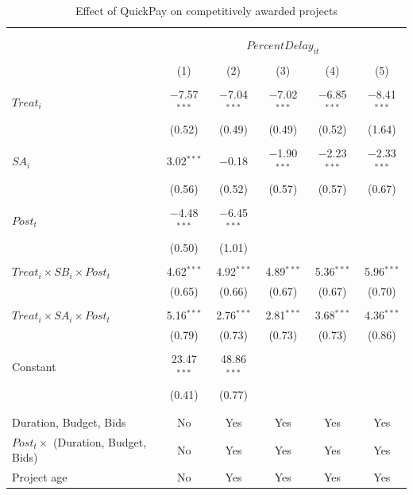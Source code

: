 \documentclass[
]{article}
\begin{document}
\begin{table}[H] \centering 
  \caption{Effect of QuickPay on competitively awarded projects} 
  \label{} 
\small 
\begin{tabular}{@{\extracolsep{-2pt}}lccccc} 
\\[-1.8ex]\hline 
\hline \\[-1.8ex] 
\\[-1.8ex] & \multicolumn{5}{c}{$PercentDelay_{it}$  } \\ 
\\[-1.8ex] & (1) & (2) & (3) & (4) & (5)\\ 
\hline \\[-1.8ex] 
 $Treat_i$ & $-$7.57$^{***}$ & $-$7.04$^{***}$ & $-$7.02$^{***}$ & $-$6.85$^{***}$ & $-$8.41$^{***}$ \\ 
  & (0.52) & (0.49) & (0.49) & (0.52) & (1.64) \\ 
  & & & & & \\ 
 $SA_i$ & 3.02$^{***}$ & $-$0.18 & $-$1.90$^{***}$ & $-$2.23$^{***}$ & $-$2.33$^{***}$ \\ 
  & (0.56) & (0.52) & (0.57) & (0.57) & (0.67) \\ 
  & & & & & \\ 
 $Post_t$ & $-$4.48$^{***}$ & $-$6.45$^{***}$ &  &  &  \\ 
  & (0.50) & (1.01) &  &  &  \\ 
  & & & & & \\ 
 $Treat_i \times SB_i \times Post_t$ & 4.62$^{***}$ & 4.92$^{***}$ & 4.89$^{***}$ & 5.36$^{***}$ & 5.96$^{***}$ \\ 
  & (0.65) & (0.66) & (0.67) & (0.67) & (0.70) \\ 
  & & & & & \\ 
 $Treat_i \times SA_i \times Post_t$ & 5.16$^{***}$ & 2.76$^{***}$ & 2.81$^{***}$ & 3.68$^{***}$ & 4.36$^{***}$ \\ 
  & (0.79) & (0.73) & (0.73) & (0.73) & (0.86) \\ 
  & & & & & \\ 
 Constant & 23.47$^{***}$ & 48.86$^{***}$ &  &  &  \\ 
  & (0.41) & (0.77) &  &  &  \\ 
  & & & & & \\ 
\hline \\[-1.8ex] 
Duration, Budget, Bids & No & Yes & Yes & Yes & Yes \\ 
$Post_t \times $  (Duration, Budget, Bids) & No & Yes & Yes & Yes & Yes \\ 
Project age & No & Yes & Yes & Yes & Yes \\ 

\end{tabular}
\end{table}
\end{document}
